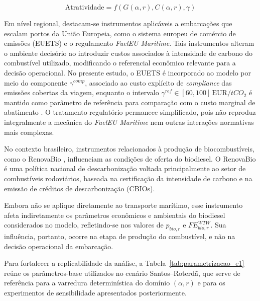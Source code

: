 \[
\text{Atratividade} = f\left(G(\alpha,r), C(\alpha,r), \gamma\right)
\]

Em nível regional, destacam-se instrumentos aplicáveis a embarcações que escalam portos da União Europeia, como o sistema europeu de comércio de emissões (\gls{EUETS}) e o regulamento \emph{FuelEU Maritime}. Tais instrumentos alteram o ambiente decisório ao introduzir custos associados à intensidade de carbono do combustível utilizado, modificando o referencial econômico relevante para a decisão operacional. No presente estudo, o \gls{EUETS} é incorporado ao modelo por meio do componente $\gamma^{comp}$, associado ao custo explícito de \emph{compliance} das emissões cobertas da viagem, enquanto o intervalo $\gamma^{ref} \in [60,100]\,\text{EUR}/tCO_2$ é mantido como parâmetro de referência para comparação com o custo marginal de abatimento \citep{euets2023,worldbank2024carbon}. O tratamento regulatório permanece simplificado, pois não reproduz integralmente a mecânica do \emph{FuelEU Maritime} nem outras interações normativas mais complexas.

No contexto brasileiro, instrumentos relacionados à produção de biocombustíveis, como o RenovaBio \citep{brasil_lei_2017}, influenciam as condições de oferta do biodiesel. O RenovaBio é uma política nacional de descarbonização voltada principalmente ao setor de combustíveis rodoviários, baseada na certificação da intensidade de carbono e na emissão de créditos de descarbonização (CBIOs).

Embora não se aplique diretamente ao transporte marítimo, esse instrumento afeta indiretamente os parâmetros econômicos e ambientais do biodiesel considerados no modelo, refletindo-se nos valores de $p_{bio,r}$ e $FE_{bio,r}^{WTW}$. Sua influência, portanto, ocorre na etapa de produção do combustível, e não na decisão operacional da embarcação.

Para fortalecer a replicabilidade da análise, a Tabela~\ref{tab:parametrizacao_e1} reúne os parâmetros-base utilizados no cenário Santos--Roterdã, que serve de referência para a varredura determinística do domínio $(\alpha,r)$ e para os experimentos de sensibilidade apresentados posteriormente.

